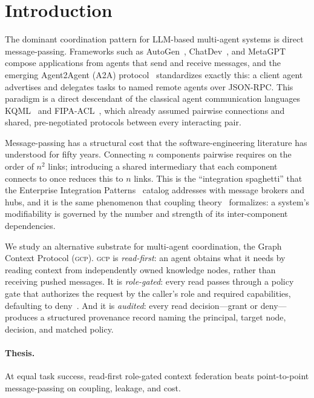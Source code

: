 \documentclass[10pt,twocolumn,letterpaper]{article}
\newcommand{\gcp}{\textsc{gcp}}
\begin{document}
\section{Introduction}

The dominant coordination pattern for LLM-based multi-agent systems is direct message-passing.
Frameworks such as AutoGen~\citep{wu2023autogen}, ChatDev~\citep{qian2024chatdev}, and
MetaGPT~\citep{hong2024metagpt} compose applications from agents that send and receive messages,
and the emerging Agent2Agent (A2A) protocol~\citep{a2a2025} standardizes exactly this: a client
agent advertises and delegates tasks to named remote agents over JSON-RPC. This paradigm is a
direct descendant of the classical agent communication languages KQML~\citep{finin1994} and
FIPA-ACL~\citep{fipa2002}, which already assumed pairwise connections and shared, pre-negotiated
protocols between every interacting pair.

Message-passing has a structural cost that the software-engineering literature has understood
for fifty years. Connecting $n$ components pairwise requires on the order of $n^2$ links;
introducing a shared intermediary that each component connects to once reduces this to $n$
links. This is the ``integration spaghetti'' that the Enterprise Integration
Patterns~\citep{hohpe2003} catalog addresses with message brokers and hubs, and it is the same
phenomenon that coupling theory~\citep{parnas1972,stevens1974,briand1999} formalizes: a system's
modifiability is governed by the number and strength of its inter-component dependencies.

We study an alternative substrate for multi-agent coordination, the Graph Context Protocol
(\gcp{}). \gcp{} is \emph{read-first}: an agent obtains what it needs by reading context from
independently owned knowledge nodes, rather than receiving pushed messages. It is
\emph{role-gated}: every read passes through a policy gate that authorizes the request by the
caller's role and required capabilities, defaulting to deny~\citep{saltzer1975,sandhu1996}. And
it is \emph{audited}: every read decision---grant or deny---produces a structured provenance
record naming the principal, target node, decision, and matched policy.

\paragraph{Thesis.} At equal task success, read-first role-gated context federation beats
point-to-point message-passing on coupling, leakage, and cost.
\end{document}
